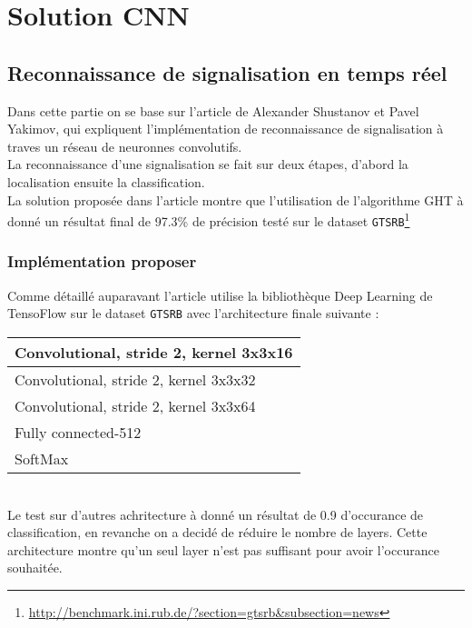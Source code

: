 \documentclass[french,a4paper,11pt,oneside]{article}
\begin{document}
	\section{Solution CNN}{
		\subsection{Reconnaissance de signalisation en temps réel}{
			Dans cette partie on se base sur l'article de Alexander Shustanov et Pavel Yakimov, qui expliquent l'implémentation de reconnaissance de signalisation à traves un réseau de neuronnes convolutifs.\\
			La reconnaissance d'une signalisation se fait sur deux étapes, d'abord la localisation ensuite la classification.\\
			La solution proposée dans l'article montre que l'utilisation de l'algorithme GHT à donné un résultat final de 97.3\% de précision testé sur le dataset \texttt{GTSRB}\footnote{\url{http://benchmark.ini.rub.de/?section=gtsrb&subsection=news}}
		 	\subsubsection{Implémentation proposer}{
		 		Comme détaillé auparavant l'article utilise la bibliothèque Deep Learning de TensoFlow sur le dataset \texttt{GTSRB} avec l'architecture finale suivante :\\
		 		
				\begin{tabular}{|l|}
					\hline
					Convolutional, stride 2, kernel 3x3x16 \\
					\hline
					Convolutional, stride 2, kernel 3x3x32 \\
					\hline
					Convolutional, stride 2, kernel 3x3x64 \\
					\hline
					Fully connected-512 \\
					\hline
					SoftMax \\
					\hline
				\end{tabular}
				\\
				Le test sur d'autres achritecture à donné un résultat de 0.9 d'occurance de classification, en revanche on a decidé de réduire le nombre de layers.
				Cette architecture montre qu'un seul layer n'est pas suffisant pour avoir l'occurance souhaitée.\\
				
}}}
\end{document}
